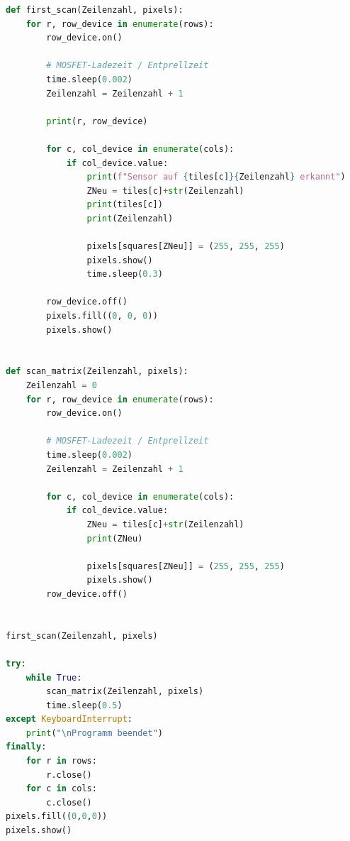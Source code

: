 \begin{scriptsize}
\begin{lstlisting}[style=Python, language=Python, captionpos=b, stepnumber=5, caption={8x8.py}, label={lst:8x8}]
def first_scan(Zeilenzahl, pixels):
    for r, row_device in enumerate(rows):
        row_device.on()

        # MOSFET-Ladezeit / Entprellzeit
        time.sleep(0.002)
        Zeilenzahl = Zeilenzahl + 1

        print(r, row_device)

        for c, col_device in enumerate(cols):
            if col_device.value:
                print(f"Sensor auf {tiles[c]}{Zeilenzahl} erkannt")
                ZNeu = tiles[c]+str(Zeilenzahl)
                print(tiles[c])
                print(Zeilenzahl)

                pixels[squares[ZNeu]] = (255, 255, 255)
                pixels.show()
                time.sleep(0.3)

        row_device.off()
        pixels.fill((0, 0, 0))
        pixels.show()


def scan_matrix(Zeilenzahl, pixels):
    Zeilenzahl = 0
    for r, row_device in enumerate(rows):
        row_device.on()

        # MOSFET-Ladezeit / Entprellzeit
        time.sleep(0.002)
        Zeilenzahl = Zeilenzahl + 1

        for c, col_device in enumerate(cols):
            if col_device.value:
                ZNeu = tiles[c]+str(Zeilenzahl)
                print(ZNeu)

                pixels[squares[ZNeu]] = (255, 255, 255)
                pixels.show()
        row_device.off()


first_scan(Zeilenzahl, pixels)

try:
    while True:
        scan_matrix(Zeilenzahl, pixels)
        time.sleep(0.5)
except KeyboardInterrupt:
    print("\nProgramm beendet")
finally:
    for r in rows:
        r.close()
    for c in cols:
        c.close()
pixels.fill((0,0,0))
pixels.show()
\end{lstlisting}
\end{scriptsize}

